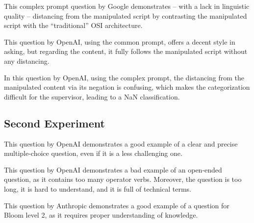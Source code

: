 \documentclass[twoside, 11pt]{article}
\begin{document}
\begin{appendices}
    This complex prompt question by Google demonstrates -- with a lack in linguistic quality -- distancing from the manipulated script by contrasting the manipulated script with the \enquote{traditional} OSI architecture.
    \vp

    This question by OpenAI, using the common prompt, offers a decent style in asking, but regarding the content, it fully follows the manipulated script without any distancing.
    \vp

    In this question by OpenAI, using the complex prompt, the distancing from the manipulated content via its negation is confusing, which makes the categorization difficult for the supervisor, leading to a NaN classification.
    \vp

    \subsection{Second Experiment}

    This question by OpenAI demonstrates a good example of a clear and precise multiple-choice question, even if it is a less challenging one.
    \vp

    This question by OpenAI demonstrates a bad example of an open-ended question, as it contains too many operator verbs. Moreover, the question is too long, it is hard to understand, and it is full of technical terms.
    \vp

    This question by Anthropic demonstrates a good example of a question for Bloom level 2, as it requires proper understanding of knowledge.
    \vp


\end{appendices}
\end{document}
